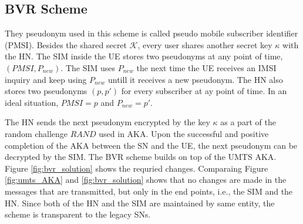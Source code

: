 \documentclass{llncs} %
\begin{document}
\subsection{BVR Scheme}
They pseudonym used in this scheme is called pseudo mobile subscriber identifier (PMSI). Besides the shared secret $\mathcal{K}$, every user shares another secret key $\kappa$ with the HN. The SIM inside the UE stores two pseudonyms at any point of time, $\left(PMSI,P_{new}\right)$. The SIM uses $P_{new}$ the next time the UE receives an IMSI inquiry and keep using $P_{new}$ untill it receives a new pseudonym. The HN also stores two pseudonyms $\left(p,p'\right)$ for every subscriber at ay point of time. In an ideal situation, $PMSI = p$ and $P_{new} = p'$. 

The HN sends the next pseudonym encrypted by the key $\kappa$ as a part of the random challenge $RAND$ used in AKA. Upon the successful and positive completion of the AKA between the SN and the UE, the next pseudonym can be decrypted by the SIM. The BVR scheme builds on top of the UMTS AKA. Figure \ref{fig:bvr_solution} shows the requried changes. Comparaing Figure \ref{fig:umts_AKA} and \ref{fig:bvr_solution} shows that no changes are made in the messages that are transmitted, but only in the end points, i.e., the SIM and the HN. Since both of the HN and the SIM are maintained by same entity, the scheme is transparent to the legacy SNs.
\end{document}
